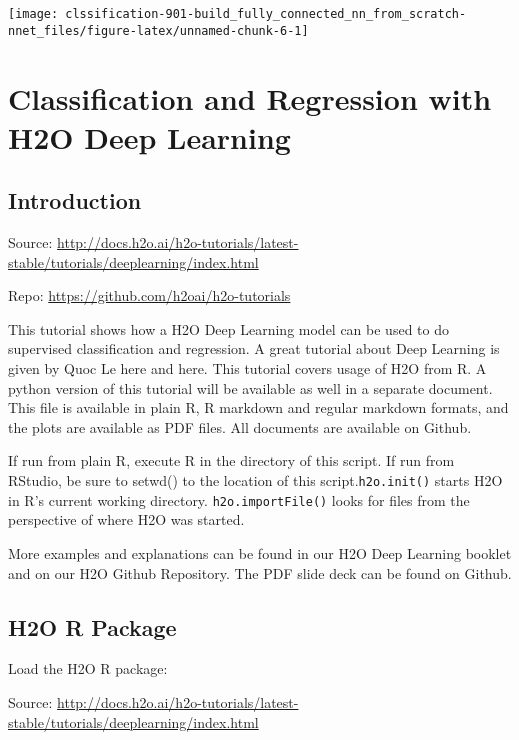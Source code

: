 \documentclass[]{book}
\begin{document}
\begin{center}\texttt{[image: clssification-901-build\_fully\_connected\_nn\_from\_scratch-nnet\_files/figure-latex/unnamed-chunk-6-1]} \end{center}

\hypertarget{classification-and-regression-with-h2o-deep-learning}{%
\chapter{Classification and Regression with H2O Deep Learning}\label{classification-and-regression-with-h2o-deep-learning}}

\hypertarget{introduction-3}{%
\section{Introduction}\label{introduction-3}}

Source: \url{http://docs.h2o.ai/h2o-tutorials/latest-stable/tutorials/deeplearning/index.html}

Repo: \url{https://github.com/h2oai/h2o-tutorials}

This tutorial shows how a H2O Deep Learning model can be used to do supervised classification and regression. A great tutorial about Deep Learning is given by Quoc Le here and here. This tutorial covers usage of H2O from R. A python version of this tutorial will be available as well in a separate document. This file is available in plain R, R markdown and regular markdown formats, and the plots are available as PDF files. All documents are available on Github.

If run from plain R, execute R in the directory of this script. If run from RStudio, be sure to setwd() to the location of this script.\texttt{h2o.init()} starts H2O in R's current working directory. \texttt{h2o.importFile()} looks for files from the perspective of where H2O was started.

More examples and explanations can be found in our H2O Deep Learning booklet and on our H2O Github Repository. The PDF slide deck can be found on Github.

\hypertarget{h2o-r-package}{%
\section{H2O R Package}\label{h2o-r-package}}

Load the H2O R package:

Source: \url{http://docs.h2o.ai/h2o-tutorials/latest-stable/tutorials/deeplearning/index.html}
\end{document}
